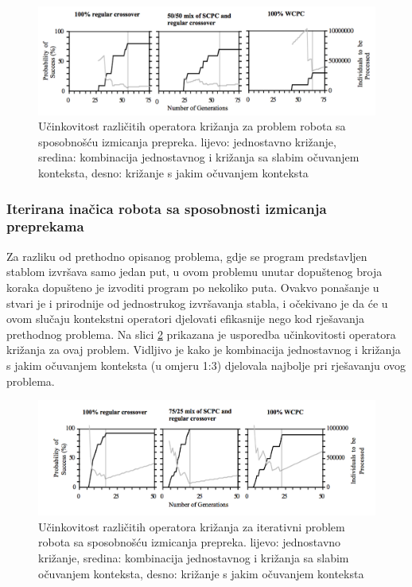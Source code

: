 \begin{figure}[H]
	\centering
	\includegraphics[scale=0.4]{./slike/robot.png}
	\caption{Učinkovitost različitih operatora križanja za problem robota sa sposobnošću izmicanja prepreka. lijevo: jednostavno križanje, sredina: kombinacija jednostavnog i križanja sa slabim očuvanjem konteksta, desno:  križanje s jakim očuvanjem konteksta}
	\label{robot}
\end{figure}


\subsubsection{Iterirana inačica robota sa sposobnosti izmicanja preprekama}
Za razliku od prethodno opisanog problema, gdje se program predstavljen stablom izvršava samo jedan put, u ovom problemu unutar dopuštenog broja koraka dopušteno je izvoditi program po nekoliko puta. Ovakvo ponašanje u stvari je i prirodnije od jednostrukog izvršavanja stabla, i očekivano je da će u ovom slučaju kontekstni operatori djelovati efikasnije nego kod rješavanja prethodnog problema. Na slici \ref{robotIt} prikazana je usporedba učinkovitosti operatora križanja za ovaj problem. Vidljivo je kako je kombinacija jednostavnog i križanja s jakim očuvanjem konteksta (u omjeru 1:3) djelovala najbolje pri rješavanju ovog problema.

\begin{figure}[H]
	\centering
	\includegraphics[scale=0.4]{./slike/robotIt.png}
	\caption{Učinkovitost različitih operatora križanja za iterativni problem robota sa sposobnošću izmicanja prepreka. lijevo: jednostavno križanje, sredina: kombinacija jednostavnog i križanja sa slabim očuvanjem konteksta, desno:  križanje s jakim očuvanjem konteksta}
	\label{robotIt}
\end{figure}



